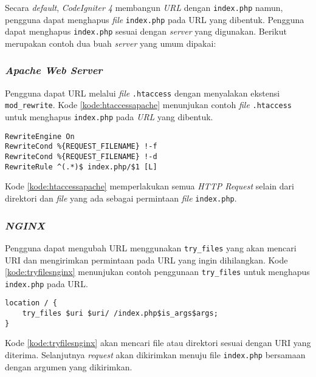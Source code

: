 Secara \textit{default}, \textit{CodeIgniter 4} membangun \textit{URL} dengan \verb|index.php| namun, pengguna dapat menghapus \textit{file} \verb|index.php| pada URL yang dibentuk. Pengguna dapat menghapus \verb|index.php| sesuai dengan \textit{server} yang digunakan. Berikut merupakan contoh dua buah \textit{server} yang umum dipakai:

\subsubsection{\textit{Apache Web Server}}
Pengguna dapat URL melalui \textit{file} \verb|.htaccess| dengan menyalakan ekstensi \verb|mod_rewrite|. Kode \ref{kode:htaccessapache} menunjukan contoh \textit{file} \verb|.htaccess| untuk menghapus \verb|index.php| pada \textit{URL} yang dibentuk.

\begin{lstlisting}[caption=Contoh \textit{file} \texttt{.htaccess} pada \textit{Apache Web Server}. ,label=kode:htaccessapache]
RewriteEngine On
RewriteCond %{REQUEST_FILENAME} !-f
RewriteCond %{REQUEST_FILENAME} !-d
RewriteRule ^(.*)$ index.php/$1 [L]
\end{lstlisting}

Kode \ref{kode:htaccessapache} memperlakukan semua \textit{HTTP Request} selain dari direktori dan \textit{file} yang ada sebagai permintaan \textit{file} \texttt{index.php}.

\subsubsection{\textit{NGINX}}
Pengguna dapat mengubah URL menggunakan \verb|try_files| yang akan mencari URI dan mengirimkan permintaan pada URL yang ingin dihilangkan. Kode \ref{kode:tryfilesnginx} menunjukan contoh penggunaan \verb|try_files| untuk menghapus \verb|index.php| pada URL.

\begin{lstlisting}[caption=Contoh penggunaan \texttt{try-files}. ,label=kode:tryfilesnginx]
location / {
    try_files $uri $uri/ /index.php$is_args$args;
}
\end{lstlisting}
Kode \ref{kode:tryfilesnginx} akan mencari file atau direktori sesuai dengan URI yang diterima. Selanjutnya \textit{request} akan dikirimkan menuju file \texttt{index.php} bersamaan dengan argumen yang dikirimkan.


